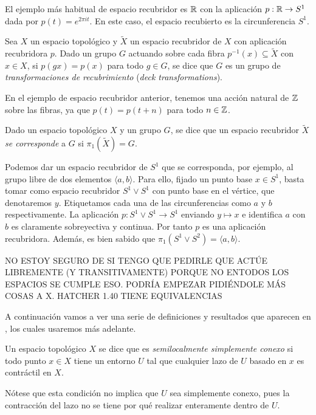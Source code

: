 \documentclass[TFG.tex]{subfiles}
\begin{document}
\begin{ej}
El ejemplo más habitual de espacio recubridor es $\mathbb{R}$ con la aplicación $p:\mathbb{R}\to S^1$ dada por $p(t)=e^{2\pi i t}$. En este caso, el espacio recubierto es la circunferencia $S^1$. 
\end{ej}

\begin{defi}
Sea $X$ un espacio topológico y $\tilde{X}$ un espacio recubridor de $X$ con aplicación recubridora $p$. Dado un grupo $G$ actuando sobre cada fibra $p^{-1}(x)\subseteq\tilde{X}$ con $x\in X$, si $p(gx)=p(x)$ para todo $g\in G$, se dice que $G$ es un grupo de \emph{transformaciones de recubrimiento} (\emph{deck transformations}).
\end{defi}

\begin{ej}
En el ejemplo de espacio recubridor anterior, tenemos una acción natural de $\mathbb{Z}$ sobre las fibras, ya que $p(t)=p(t+ n)$ para todo $n\in\mathbb{Z}$. 
\end{ej}

\begin{defi}
Dado un espacio topológico $X$ y un grupo $G$, se dice que un espacio recubridor $\tilde{X}$ \emph{se corresponde} a $G$ si $\pi_1(\tilde{X})=G$. 
\end{defi}

\begin{ej}
Podemos dar un espacio recubridor de $S^1$ que se corresponda, por ejemplo, al grupo libre de dos elementos $\langle a, b\rangle$. Para ello, fijado un punto base $x\in S^1$, basta tomar como espacio recubridor $S^1\lor S^1$ con punto base en el vértice, que denotaremos $y$. Etiquetamos cada una de las circunferencias como $a$ y $b$ respectivamente. La aplicación $p:S^1\lor S^1\to S^1$ enviando $y\mapsto x$ e identifica $a$ con $b$ es claramente sobreyectiva y continua. Por tanto $p$ es una aplicación recubridora. Además, es bien sabido que $\pi_1(S^1\lor  S^2)=\langle a, b\rangle$. 
\end{ej}

NO ESTOY SEGURO DE SI TENGO QUE PEDIRLE QUE ACTÚE LIBREMENTE (Y TRANSITIVAMENTE) PORQUE NO ENTODOS LOS ESPACIOS SE CUMPLE ESO. PODRÍA EMPEZAR PIDIÉNDOLE MÁS COSAS A X. HATCHER 1.40 TIENE EQUIVALENCIAS 

A continuación vamos a ver una serie de definiciones y resultados que aparecen en \cite{Hatcher}, los cuales usaremos más adelante.

\begin{defi}
Un espacio topológico $X$ se dice que es \emph{semilocalmente simplemente conexo} si todo punto $x\in X$ tiene un entorno $U$ tal que cualquier lazo de $U$ basado en $x$ es contráctil en $X$. 
\end{defi}
Nótese que esta condición no implica que $U$ sea simplemente conexo, pues la contracción del lazo no se tiene por qué realizar enteramente dentro de $U$.
\end{document}
